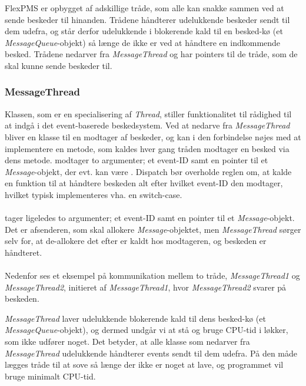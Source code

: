 FlexPMS er opbygget af adskillige tråde, som alle kan snakke sammen ved at sende beskeder til hinanden. Trådene håndterer udelukkende beskeder sendt til dem udefra, og står derfor udelukkende i blokerende kald til en besked-kø (et \textit{MessageQueue}-objekt) så længe de ikke er ved at håndtere en indkommende besked. Trådene nedarver fra \textit{MessageThread} og har pointers til de tråde, som de skal kunne sende beskeder til.



\subsubsection{MessageThread}
Klassen, som er en specialisering af \textit{Thread}, stiller funktionalitet til rådighed til at indgå i det event-baserede beskedsystem. Ved at nedarve fra \textit{MessageThread} bliver en klasse til en modtager af beskeder, og kan i den forbindelse nøjes med at implementere en  metode, som kaldes hver gang tråden modtager en besked via dens  metode.  modtager to argumenter; et event-ID samt en pointer til et \textit{Message}-objekt, der evt. kan være . Dispatch bør overholde reglen om, at kalde en funktion til at håndtere beskeden alt efter hvilket event-ID den modtager, hvilket typisk implementeres vha. en switch-case.\\\\

 tager ligeledes to argumenter; et event-ID samt en pointer til et \textit{Message}-objekt. Det er afsenderen, som skal allokere \textit{Message}-objektet, men \textit{MessageThread} sørger selv for, at de-allokere det efter  er kaldt hos modtageren, og beskeden er håndteret.\\\\

Nedenfor ses et eksempel på kommunikation mellem to tråde, \textit{MessageThread1} og \textit{MessageThread2}, initieret af \textit{MessageThread1}, hvor \textit{MessageThread2} svarer på beskeden. 


\textit{MessageThread} laver udelukkende blokerende kald til dens besked-kø (et \textit{MessageQueue}-objekt), og dermed undgår vi at stå og bruge CPU-tid i løkker, som ikke udfører noget. Det betyder, at alle klasse som nedarver fra \textit{MessageThread} udelukkende håndterer events sendt til dem udefra. På den måde lægges tråde til at sove så længe der ikke er noget at lave, og programmet vil bruge minimalt CPU-tid.


